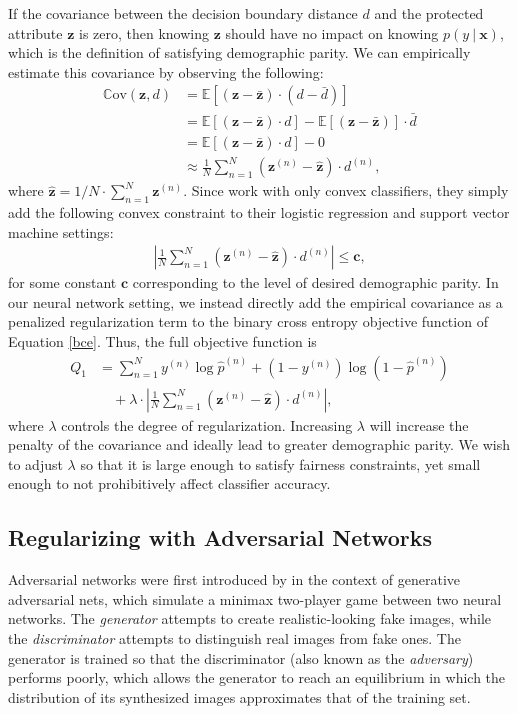\documentclass{article}
\newcommand{\E}{\mathbb{E}}
\newcommand{\Cov}{\mathbb{C}\text{ov}}
\newcommand\given[1][]{\:#1\vert\:}
\newcommand{\bd}[1]{\boldsymbol{#1}}
\newcommand{\hp}{\hat{p}}
\newcommand{\zbar}{\bar{z}}
\newcommand{\hz}{\hat{z}}
\newcommand{\dbar}{\bar{d}}
\newcommand{\idx}[3][]{{#2}^{(#3)}_{#1}}
\newcommand{\bidx}[3][]{\bd{#2}^{(#3)}_{#1}}
\begin{document}
If the covariance between the decision boundary distance $d$ and the protected attribute $\bd z$ is zero, then knowing $\bd z$ should have no impact on knowing $p(y \given \bd x)$, which is the definition of satisfying demographic parity.  We can empirically estimate this covariance by observing the following:
\begin{align}
\Cov(\bd z, d) &= \E[(\bd z - \bd \zbar) \cdot (d - \dbar)] \\
&= \E[(\bd z - \bd \zbar) \cdot d] - \E[(\bd z - \bd \zbar)] \cdot \dbar \nonumber \\
&= \E[(\bd z - \bd \zbar) \cdot d] - 0 \nonumber \\
&\approx \frac{1}{N} \sum_{n=1}^N (\bidx z n - \bd \hz) \cdot \idx d n, \nonumber
\end{align}      
where $\bd \hz = 1 / N \cdot \sum_{n=1}^N \bidx z n$.  Since \citet{zafar2015fairness} work with only convex classifiers, they simply add the following convex constraint to their logistic regression and support vector machine settings:
\begin{align}
\left | \frac{1}{N} \sum_{n=1}^N (\bidx z n - \bd \hz) \cdot \idx d n \right | \leq \bd c,
\end{align}
for some constant $\bd c$ corresponding to the level of desired demographic parity.  In our neural network setting, we instead directly add the empirical covariance as a penalized regularization term to the binary cross entropy objective function of Equation \ref{bce}.  Thus, the full objective function is
\begin{align}
Q_1 &= \sum_{n=1}^N \idx y n \log \idx \hp n + (1 - \idx y n) \log (1 - \idx \hp n) \label{penalty-bce} \\ 
&\quad + \lambda \cdot \left | \frac{1}{N}  \sum_{n=1}^N (\bidx z n - \bd \hz) \cdot \idx d n \right|, \nonumber
\end{align}
where $\lambda$ controls the degree of regularization.  Increasing $\lambda$ will increase the penalty of the covariance and ideally lead to greater demographic parity.  We wish to adjust $\lambda$ so that it is large enough to satisfy fairness constraints, yet small enough to not prohibitively affect classifier accuracy.    

\subsection{Regularizing with Adversarial Networks}
\label{sec:adversarial} 

Adversarial networks were first introduced by \citet{goodfellow2014generative} in the context of generative adversarial nets, which simulate a minimax two-player game between two neural networks.  The \emph{generator} attempts to create realistic-looking fake images, while the \emph{discriminator} attempts to distinguish real images from fake ones.  The generator is trained so that the discriminator (also known as the \emph{adversary}) performs poorly, which allows the generator to reach an equilibrium in which the distribution of its synthesized images approximates that of the training set. 
\end{document}
